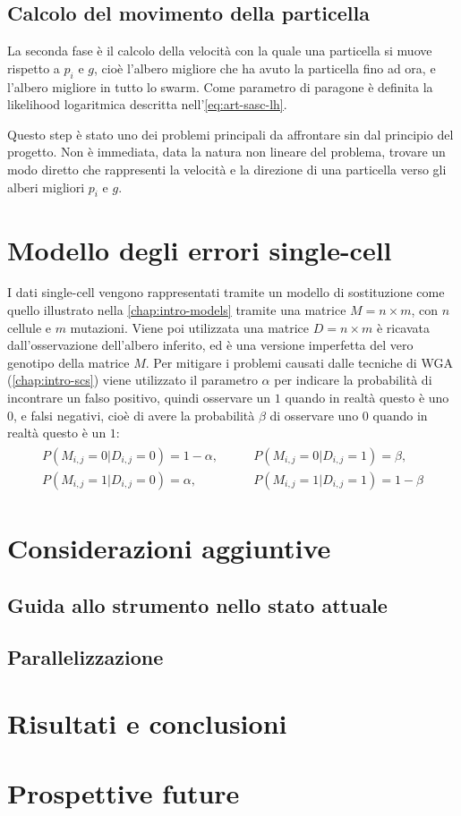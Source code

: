 \subsection{Calcolo del movimento della particella}
\label{chap:pso-adapt-calculate}
La seconda fase è il calcolo della velocità con la quale una particella si muove rispetto a $p_i$ e $g$, cioè l'albero migliore che ha avuto la particella fino ad ora, e l'albero migliore in tutto lo swarm. Come parametro di paragone è definita la likelihood logaritmica descritta nell'\autoref{eq:art-sasc-lh}.

Questo step è stato uno dei problemi principali da affrontare sin dal principio del progetto. Non è immediata, data la natura non lineare del problema, trovare un modo diretto che rappresenti la velocità e la direzione di una particella verso gli alberi migliori $p_i$ e $g$. 

\section{Modello degli errori single-cell}
\label{chap:pso-matrix}
I dati single-cell vengono rappresentati tramite un modello di sostituzione come quello illustrato nella \autoref{chap:intro-models} tramite una matrice $M = n \times m$, con $n$ cellule e $m$ mutazioni. Viene poi utilizzata una matrice $D = n \times m$ è ricavata dall'osservazione dell'albero inferito, ed è una versione imperfetta del vero genotipo della matrice $M$. Per mitigare i problemi causati dalle tecniche di WGA (\autoref{chap:intro-scs}) viene utilizzato il parametro $\alpha$ per indicare la probabilità di incontrare un falso positivo, quindi osservare un $1$ quando in realtà questo è uno $0$, e falsi negativi, cioè di avere la probabilità $\beta$ di osservare uno $0$ quando in realtà questo è un $1$:
\begin{align}
    \label{eq:art-intro-model-matrix}
    \begin{split}
      P(M_{i,j} = 0 | D_{i,j} = 0) = 1 - \alpha, \qquad
      &P(M_{i,j} = 0 | D_{i,j} = 1) = \beta, \\
      P(M_{i,j} = 1 | D_{i,j} = 0) = \alpha, \qquad
      &P(M_{i,j} = 1 | D_{i,j} = 1) = 1 - \beta
    \end{split}
\end{align}

\section{Considerazioni aggiuntive}

\subsection{Guida allo strumento nello stato attuale}

\subsection{Parallelizzazione}

\section{Risultati e conclusioni}

\section{Prospettive future}
